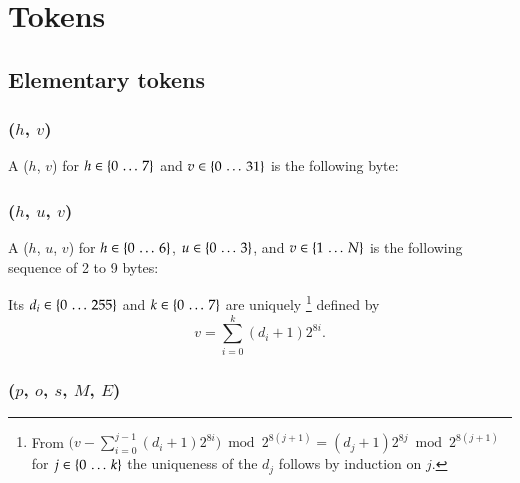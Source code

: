 
\section{Tokens}
\label{sec:tokens}

\subsection{Elementary tokens}

\subsubsection{\DborMinimalToken(\texorpdfstring{$h$, $v$}{h, v})}
\hypertarget{sec:def:MinimalToken}{}

A \DborMinimalToken($h$, $v$) for $h \in \{0 \,\ldots\, 7\}$ and $v \in \{0 \,\ldots\, 31\}$
is the following byte:



\subsubsection{\DborNaturalToken(\texorpdfstring{$h$, $u$, $v$}{h, u, v})}
\hypertarget{sec:def:NaturalToken}{}

A \DborNaturalToken($h$, $u$, $v$)
for $h \in \{0 \,\ldots\, 6\}$,
$u \in \{0 \,\ldots\, 3\}$,
and $v \in \{1 \,\ldots\, N\}$
is the following sequence of 2 to 9 bytes:


Its $d_i \in \{0 \,\ldots\, 255\}$ and $k \in \{0 \,\ldots\, 7\}$ are uniquely%
\footnote{%
    From $\big(v - \sum_{i = 0}^{j - 1} (d_i + 1) 2^{8 i}\big) \bmod 2^{8 (j + 1)} = (d_j + 1) 2^{8 j} \bmod 2^{8 (j + 1)}$
    for $j \in \{0 \,\ldots\, k\}$
    the uniqueness of the $d_j$ follows by induction on $j$.
}
defined by
\begin{equation}
    v =\sum_{i = 0}^k (d_i + 1) 2^{8 i}.
\end{equation}


\subsubsection{\DborBinaryRationalToken(\texorpdfstring{$p$, $o$, $s$, $M$, $E$}{p, o, s, M, E})}
\hypertarget{sec:def:BinaryRationalToken}{}

